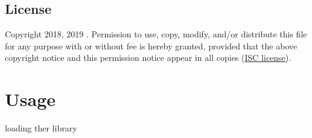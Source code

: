 \documentclass[
  draft,
  paper=a4,
  version=3.25,
  pagesize=pdftex,
  twoside=false,
  toc=listof,
]{scrartcl}
\begin{document}
\subsection{License}

  Copyright 2018, 2019 \MS. Permission to use, copy, modify, and/or distribute this file for any purpose with or without fee is hereby granted, provided that the above copyright notice and this permission notice appear in all copies (\href{https://www.tldrlegal.com/l/isc}{ISC license}).

\section{Usage}\label{sec:use}

  loading ther library


\vhListAllAuthorsLongWithAbbrev
\end{document}
